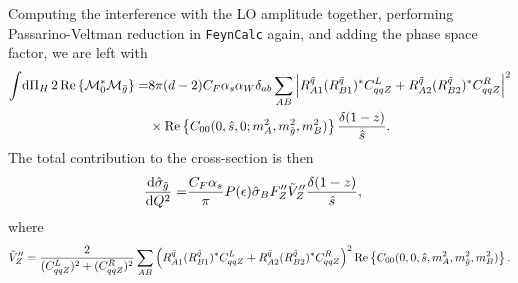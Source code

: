\documentclass[../main.tex]{subfiles}
\begin{document}
Computing the interference with the LO amplitude together, performing Passarino-Veltman reduction in \verb|FeynCalc| again, and adding the phase space factor, we are left with
\begin{align}
  \nonumber
  \int \!\mathrm{d}\Pi_H\, 2\operatorname{Re}\left\{\mathcal{M}_0^\ast \mathcal{M}_{\tilde{g}}\right\} = & 8\pi (d-2) C_F \alpha_s \alpha_W \delta_{ab} \sum_{AB} \left|R^{\tilde{q}}_{A1}(R^{\tilde{q}}_{B1})^\ast C_{qqZ}^L + R^{\tilde{q}}_{A2}(R^{\tilde{q}}_{B2})^\ast C_{qqZ}^R\right|^2 \\
                                                    & \times \operatorname{Re}\left\{C_{00}(0,\hat{s},0;m_A^2, m_{\tilde{g}}^2, m_B^2)\right\} \frac{\delta(1-z)}{\hat{s}}.
\end{align}
The total contribution to the cross-section is then
\begin{align}
  \label{pc:eq:sigma_gtilde_virtual}
  \d[Q^2]{\hat\sigma_{\tilde{g}}} = & \frac{C_F \alpha_s}{\pi} P(\epsilon) \hat\sigma_B F^{\prime\prime}_Z \tilde{V}^{\prime\prime}_Z \frac{\delta(1-z)}{\hat{s}},
\end{align}
where
\begin{align}
  \tilde{V}^{\prime\prime}_Z = \frac{2}{(C_{qqZ}^L)^2 + (C_{qqZ}^R)^2}\sum_{AB} \left(R^{\tilde{q}}_{A1}(R^{\tilde{q}}_{B1})^\ast C_{qqZ}^L + R^{\tilde{q}}_{A2}(R^{\tilde{q}}_{B2})^\ast C_{qqZ}^R\right)^2 \operatorname{Re}\left\{C_{00}(0,0,\hat{s},m_A^2,m_{\tilde{g}}^2,m_B^2)\right\}.
\end{align}

\end{document}
